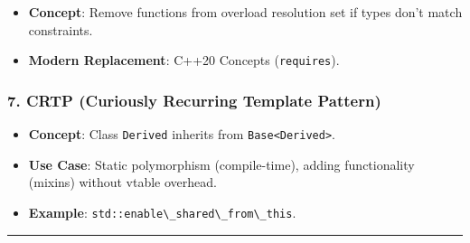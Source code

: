 \begin{itemize}
\tightlist
\item
  \textbf{Concept}: Remove functions from overload resolution set if
  types don't match constraints.
\item
  \textbf{Modern Replacement}: C++20 Concepts
  (\passthrough{\lstinline!requires!}).
\end{itemize}

\hypertarget{crtp-curiously-recurring-template-pattern}{%
\subsubsection{7. CRTP (Curiously Recurring Template
Pattern)}\label{crtp-curiously-recurring-template-pattern}}

\begin{itemize}
\tightlist
\item
  \textbf{Concept}: Class \passthrough{\lstinline!Derived!} inherits
  from \passthrough{\lstinline!Base<Derived>!}.
\item
  \textbf{Use Case}: Static polymorphism (compile-time), adding
  functionality (mixins) without vtable overhead.
\item
  \textbf{Example}:
  \passthrough{\lstinline!std::enable\_shared\_from\_this!}.
\end{itemize}

\begin{center}\rule{0.5\linewidth}{0.5pt}\end{center}
